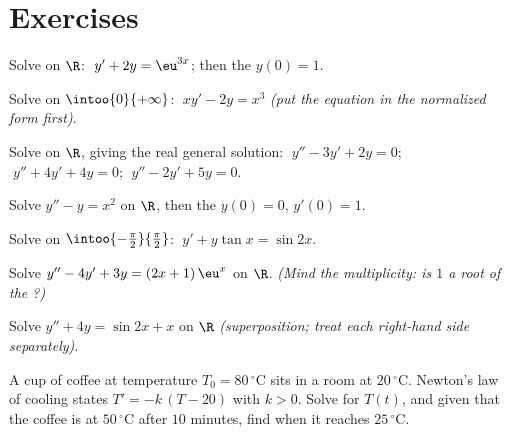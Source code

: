 \section{Exercises}

\begin{exercise}[$\star$]\label{exo:b1:diffeq:1}
Solve on $\R$: $\;y' + 2y = \eu^{3x}$; then the  $y(0) =
1$.
\end{exercise}

\begin{exercise}[$\star$]\label{exo:b1:diffeq:2}
Solve on $\intoo{0}{+\infty}$: $\;x y' - 2y = x^3$ \emph{(put the
equation in the normalized form first)}.
\end{exercise}

\begin{exercise}[$\star$]\label{exo:b1:diffeq:3}
Solve on $\R$, giving the real general solution:
$\;y'' - 3y' + 2y = 0$; $\;y'' + 4y' + 4y = 0$; $\;y'' - 2y' + 5y =
0$.
\end{exercise}

\begin{exercise}[$\star$]\label{exo:b1:diffeq:4}
Solve $y'' - y = x^2$ on $\R$, then the  $y(0) = 0$,
$y'(0) = 1$.
\end{exercise}

\begin{exercise}[$\star\star$]\label{exo:b1:diffeq:5}
Solve on $\intoo{-\frac\pi2}{\frac\pi2}$:
$\;y' + y\tan x = \sin 2x$.
\end{exercise}

\begin{exercise}[$\star\star$]\label{exo:b1:diffeq:6}
Solve $y'' - 4y' + 3y = (2x + 1)\,\eu^{x}$ on $\R$. \emph{(Mind the
multiplicity: is $1$ a root of the ?)}
\end{exercise}

\begin{exercise}[$\star\star$]\label{exo:b1:diffeq:7}
Solve $y'' + 4y = \sin 2x + x$ on $\R$ \emph{(superposition; treat
each right-hand side separately)}.
\end{exercise}

\begin{exercise}[$\star\star$]\label{exo:b1:diffeq:8}
A cup of coffee at temperature $T_0 = 80\,^\circ$C sits in a room at
$20\,^\circ$C. Newton's law of cooling states $T' = -k\,(T - 20)$ with
$k > 0$. Solve for $T(t)$, and given that the coffee is at
$50\,^\circ$C after $10$ minutes, find when it reaches
$25\,^\circ$C.
\end{exercise}


